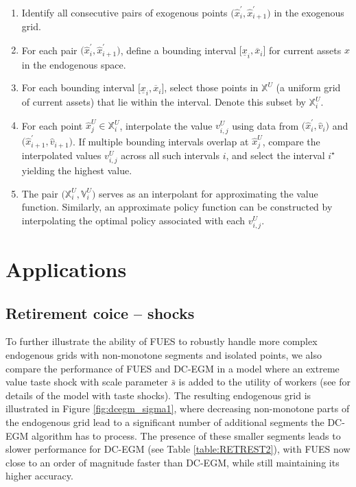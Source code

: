 \documentclass[12pt]{article}
\begin{document}
\begin{enumerate}[label=(\roman*)]
    \item Identify all consecutive pairs of exogenous points 
    \(\bigl(\hat{x}_{i}^{\prime}, \hat{x}_{i+1}^{\prime}\bigr)\) in the exogenous grid.
    
    \item For each pair \(\bigl(\hat{x}_{i}^{\prime}, \hat{x}_{i+1}^{\prime}\bigr)\), define a bounding interval 
    \(\bigl[\underline{x}_{i},\overline{x}_{i}\bigr]\)
    for current assets \(x\) in the endogenous space. %
    
    \item For each bounding interval \(\bigl[\underline{x}_{i},\overline{x}_{i}\bigr]\), select those points in \(\mathbb{X}^{U}\) (a uniform grid of current assets) that lie within the interval. Denote this subset by \(\mathbb{X}_{i}^{U}\).

    \item For each point \(\hat{x}^{U}_{j}\in \mathbb{X}_{i}^{U}\), interpolate the value 
    \(v_{i,j}^{U}\)
    using data from 
    \(\bigl(\hat{x}_{i}^{\prime}, \hat{v}_{i}\bigr)\)
    and
    \(\bigl(\hat{x}_{i+1}^{\prime}, \hat{v}_{i+1}\bigr)\).
    If multiple bounding intervals overlap at \(\hat{x}^{U}_{j}\), compare the interpolated values \(v_{i,j}^{U}\) across all such intervals \(i\), and select the interval \(i^{\star}\) yielding the highest value.

    \item The pair 
    \(\bigl(\mathbb{X}_{i}^{U}, \mathbb{V}_{i}^{U}\bigr)\)
    serves as an interpolant for approximating the value function. Similarly, an approximate policy function can be constructed by interpolating the optimal policy  associated with each $v_{i,j}^{U}$. %
\end{enumerate}

\section{Applications}

\subsection{Retirement coice -- shocks}\label{appx:retShocks}
To further illustrate the ability of FUES to robustly handle more complex endogenous grids with non-monotone segments and isolated points, we also compare the performance of FUES and DC-EGM in a model where an extreme value taste shock with scale parameter $\bar{s}$ is added to the utility of workers (see \cite{Iskhakov2017} for details of the model with taste shocks). The resulting endogenous grid is illustrated in Figure \ref{fig:dcegm_sigma1}, where decreasing non-monotone parts of the endogenous grid lead to a significant number of additional segments the DC-EGM algorithm has to process. The presence of these smaller segments leads to slower performance for DC-EGM (see Table \ref{table:RETREST2}), with FUES now close to an order of magnitude faster than DC-EGM, while still maintaining its higher accuracy. 
\end{document}
